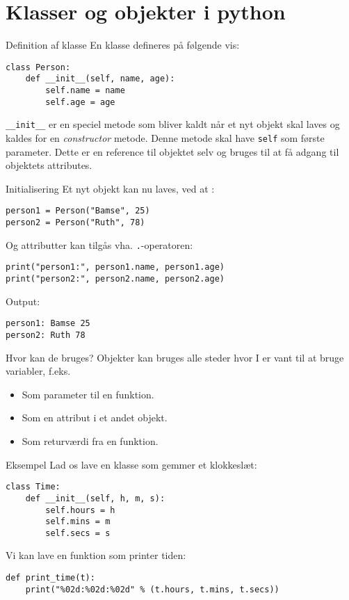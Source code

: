 \documentclass[main.tex]{subfiles}
\begin{document}
\section{Klasser og objekter i python}


\begin{frame}[fragile]{Definition af klasse}
	En klasse defineres på følgende vis:
		\begin{lstlisting}[style=python]
class Person:
	def __init__(self, name, age):
		self.name = name
		self.age = age
	\end{lstlisting}
	\texttt{\_\_init\_\_} er en speciel metode som bliver kaldt når et nyt objekt skal laves og kaldes for en \textit{constructor} metode. Denne metode skal have \texttt{self} som første parameter. Dette er en reference til objektet selv og bruges til at få adgang til objektets attributes.
\end{frame}

\begin{frame}[fragile]{Initialisering}
	Et nyt objekt kan nu laves, ved at :
		\begin{lstlisting}[style=python]
person1 = Person("Bamse", 25)
person2 = Person("Ruth", 78)
	\end{lstlisting}
	Og attributter kan tilgås vha. \texttt{.}-operatoren:
	\begin{lstlisting}[style=python]
print("person1:", person1.name, person1.age)
print("person2:", person2.name, person2.age)
	\end{lstlisting}
	Output:
	\begin{lstlisting}[style=python]
person1: Bamse 25
person2: Ruth 78
	\end{lstlisting}
\end{frame}

\begin{frame}{Hvor kan de bruges?}
	Objekter kan bruges alle steder hvor I er vant til at bruge variabler, f.eks.
	\begin{itemize}
		\item Som parameter til en funktion.
		\item Som en attribut i et andet objekt.
		\item Som returværdi fra en funktion.
	\end{itemize}
\end{frame}

\begin{frame}[fragile]{Eksempel}
	Lad os lave en klasse som gemmer et klokkeslæt:
		\begin{lstlisting}[style=python]
class Time:
	def __init__(self, h, m, s):
		self.hours = h
		self.mins = m
		self.secs = s
	\end{lstlisting}
	\pause
	Vi kan lave en funktion som printer tiden:
	\begin{lstlisting}[style=python]
def print_time(t):
	print("%02d:%02d:%02d" % (t.hours, t.mins, t.secs))
	\end{lstlisting}
\end{frame}
\end{document}
